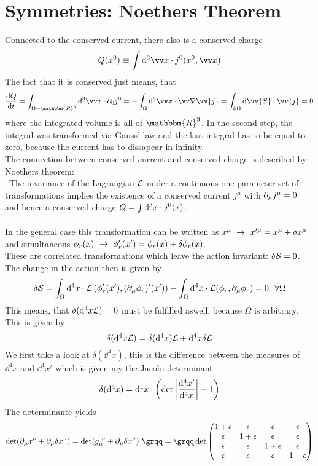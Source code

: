 \section{Symmetries: Noethers Theorem}
Connected to the conserved current, there also is a conserved charge
\[ Q(x^0) \equiv \int \dd^3 \vx \cc j^0(x^0, \vx)\]
The fact that it is conserved just means, that 
\[ \frac{ \dd Q}{\dd t} = \int_{\Omega = \mathbbm{R}^3} \dd^3 \vx \cc \p_0 j^0 = - \int_\Omega \dd^3 \vx\cc \vn \vv{j} = \int_{\p \Omega} \dd \vv{S} \cc \vv{j} = 0\]
where the integrated volume is all of $\mathbbm{R}^3$. In the second step, the integral was transformed via Gauss' law and the last integral has to be equal to zero, because the current has to dissapear in infinity.\\
The connection between conserved current and conserved charge is described by Noethers theorem:\\\
The invariance of the Lagrangian $\mathcal{L}$ under a continuous one-parameter set of transformations implies the existence of a conserved current $j^\mu$ with $\partial_\mu j^\mu = 0$ and hence a conserved charge $Q = \int {\rm d} ^3 x \cdot j^0(x)$.\\
\\
In the general case this transformation can be written as $x^\mu ~\rightarrow ~ x'^\mu = x^\mu + \delta x^\mu$ and simultaneous $\phi_r(x) ~\rightarrow~ \phi_r'(x') = \phi_r(x) + \delta \phi_r(x)$.\\
These are correlated transformations which leave the action invariant: $\delta \mathcal{S} = 0$. The change in the action then is given by
\[ \delta \mathcal{S} = \int_\Omega {\rm d}^4 x \cdot \mathcal{L}\left(\phi_r'(x'), (\partial_\mu \phi_r)'(x')\right) - \int_\Omega {\rm d}^4 x \cdot \mathcal{L}(\phi_r, \partial_\mu \phi_r) = 0~~ \forall \Omega\]
This means, that $\delta({\rm d} ^4 x \mathcal{L}) = 0$ must be fulfilled aswell, because $\Omega$ is arbitrary. This is given by
\[ \delta( {\rm d}^4 x \mathcal{L}) = \delta( {\rm d}^4x) \mathcal{L} + {\rm d}^4x \delta\mathcal{L}\]
We first take a look at $\delta( \dd^4 x)$, this is the difference between the measures of $\dd^4x$ and $\dd^4 x'$ which is given my the Jacobi determinant
\[ \delta( {\rm d}^4 x) = {\rm d}^4 x \cdot \left( \det\left| \frac{{\rm d}^4 x'}{{\rm d}^4 x} \right| - 1\right)\]
The determinante yields
\[ \det( \p_\mu x^\nu + \p_\mu \delta x^\nu) = \det( g_\mu^{~\nu} + \p_\mu \delta x^\nu) ~\grqq = \grqq \det\begin{pmatrix}1+\eps & \eps & \eps & \eps\\ \eps &  1+ \eps & \eps & \eps \\ \eps & \eps & 1+ \eps & \eps \\ \eps & \eps & \eps & 1+ \eps \end{pmatrix}\]
